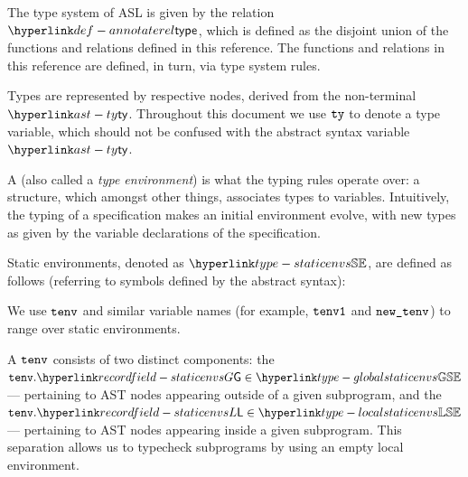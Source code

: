 \hypertarget{def-annotaterel}{}
The type system of ASL is given by the relation $\annotaterel$, which is defined as the disjoint union
of the functions and relations defined in this reference.
The functions and relations in this reference are defined, in turn, via type system rules.

Types are represented by respective \typedast{} nodes, derived from the non-terminal $\ty$.
Throughout this document we use $\texttt{ty}$ to denote a type variable, which should not be confused with the abstract syntax variable $\ty$.

\ChapterOutline

A \emph{\staticenvironmentterm{}} (also called a \emph{type environment}) is what the typing rules operate over:
a structure, which amongst other things, associates types to variables.
Intuitively, the typing of a specification makes an initial environment evolve, with new types as given by the
variable declarations of the specification.

\begin{definition}
Static environments, denoted as $\staticenvs$,
are defined as follows (referring to symbols defined by the abstract syntax):
\end{definition}

We use $\texttt{tenv}$ and similar variable names (for example, $\texttt{tenv1}$ and $\texttt{new\_tenv}$) to range over static environments.

A \staticenvironmentterm{} $\texttt{tenv}$ consists of two
distinct components: the \emph{\globalstaticenvironmentterm} $\tenv.\staticenvsG \in \globalstaticenvs$ --- pertaining to AST nodes
appearing outside of a given subprogram, and the \emph{\localstaticenvironmentterm}
$\tenv.\staticenvsL \in \localstaticenvs$ --- pertaining to AST nodes appearing inside a given subprogram.
This separation allows us to typecheck subprograms by using an empty local environment.

